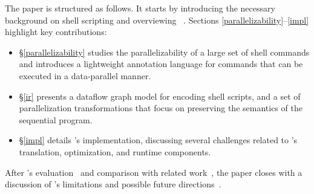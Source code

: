 \documentclass[letterpaper,twocolumn,10pt]{article}
\newcommand{\nv}[1]{[{\color{cyan}nv: #1}]}
\newcommand{\kk}[1]{[{\color{magenta}kk: #1}]}
\begin{document}
The paper is structured as follows.
It starts by introducing the necessary background on shell scripting and overviewing \sys~.
Sections \ref{parallelizability}--\ref{impl} highlight key contributions:
\begin{itemize}
  \item
  \S\ref{parallelizability}
    studies the parallelizability of a large set of shell commands and introduces a lightweight annotation language for commands that can be executed in a data-parallel manner.

  \item
  \S\ref{ir} presents a dataflow graph model for encoding shell scripts, and a set of parallelization transformations that focus on preserving the semantics of the sequential program.

  \item
  \S\ref{impl} details \sys's implementation, discussing several challenges related to \sys's translation, optimization, and runtime components.

\end{itemize}

\noindent
After \sys's evaluation~ and  comparison with related work~, the paper closes with a discussion of \sys's limitations and possible future directions~.  


\end{document}
